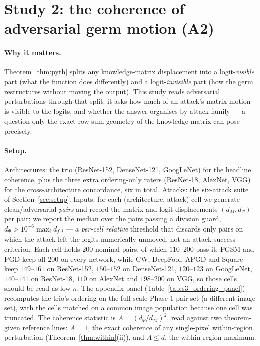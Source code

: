 \section{Study 2: the coherence of adversarial germ motion (A2)}
\label{sec:study2}
\label{sec:A2}

\paragraph{Why it matters.}
Theorem~\ref{thm:pyth} splits any knowledge-matrix displacement into a
logit-\emph{visible} part (what the function does differently) and a
logit-\emph{invisible} part (how the germ restructures without moving the
output). This study reads adversarial perturbations through that split: it
asks how much of an attack's matrix motion is visible to the logits, and
whether the answer organises by attack family --- a question only the
exact row-sum geometry of the knowledge matrix can pose precisely.

\paragraph{Setup.}
Architectures: the trio (ResNet-152, DenseNet-121, GoogLeNet) for the
headline coherence, plus the three extra ordering-only raters (ResNet-18,
AlexNet, VGG) for the cross-architecture concordance, six in total. Attacks:
the six-attack suite of Section~\ref{sec:setup}. Inputs: for each
(architecture, attack) cell we generate clean/adversarial \emph{pairs} and
record the matrix and logit displacements $(d_M, d_\Psi)$ per pair; we report
the median over the pairs passing a division guard,
$d_\Psi > 10^{-6}\max_i d_{f,i}$ --- a \emph{per-cell relative} threshold that
discards only pairs on which the attack left the logits numerically
unmoved, not an attack-success criterion. Each cell holds $200$ nominal
pairs, of which $110$--$200$ pass it: FGSM and PGD keep all $200$ on every
network, while CW, DeepFool, APGD and Square keep $149$--$161$ on
ResNet-152, $150$--$152$ on DenseNet-121, $120$--$123$ on GoogLeNet,
$140$--$141$ on ResNet-18, $110$ on AlexNet and $198$--$200$ on VGG, so those
cells should be read as low-$n$. The appendix panel
(Table~\ref{tab:s3_ordering_panel}) recomputes the trio's ordering on the
full-scale Phase-1 pair set (a different image set), with the cells matched
on a common image population because one cell was truncated. The coherence statistic is
$A = (d_\Psi/d_M)^2$, read against two theorem-given reference lines:
$A = 1$, the exact coherence of any single-pixel within-region
perturbation (Theorem~\ref{thm:within}(ii)), and $A \le d$, the
within-region maximum.


